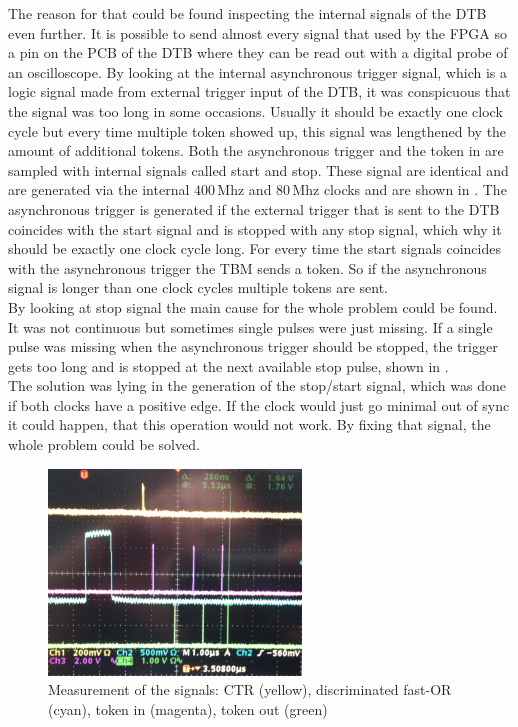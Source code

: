 \documentclass[british,11pt,a4paper]{memoir}
\begin{document}
The reason for that could be found inspecting the internal signals of the \ac{DTB} even further. It is possible to send almost every signal that used by the \ac{FPGA} so a pin on the \ac{PCB} of the \ac{DTB} where they can be read out with a digital probe of an oscilloscope. By looking at the internal asynchronous trigger signal, which is a logic signal made from external trigger input of the \ac{DTB}, it was conspicuous that the signal was too long in some occasions. Usually it should be exactly one clock cycle but every time multiple token showed up, this signal was lengthened by the amount of additional tokens. Both the asynchronous trigger and the token in are sampled with internal signals called start and stop. These signal are identical and are generated via the internal $400\,$Mhz and $80\,$Mhz clocks and are shown in . The asynchronous trigger is generated if the external trigger that is sent to the \ac{DTB} coincides with the start signal and is stopped with any stop signal, which why it should be exactly one clock cycle long. For every time the start signals coincides with the asynchronous trigger the \ac{TBM} sends a token. So if the asynchronous signal is longer than one clock cycles multiple tokens are sent.\\
By looking at stop signal the main cause for the whole problem could be found. It was not continuous but sometimes single pulses were just missing. If a single pulse was missing when the asynchronous trigger should be stopped, the trigger gets too long and is stopped at the next available stop pulse, shown in .\\
The solution was lying in the generation of the stop/start signal, which was done if both clocks have a positive edge. If the clock would just go minimal out of sync it could happen, that this operation would not work. By fixing that signal, the whole problem could be solved.
\begin{figure}[ht]
	\centering
	\includegraphics[width=0.6\textwidth]{doubletoken}
	\caption{Measurement of the signals: \ac{CTR} (yellow), discriminated fast-OR (cyan), token in (magenta), token out (green)}
	\label{p2tok}
\end{figure}\no
\end{document}
